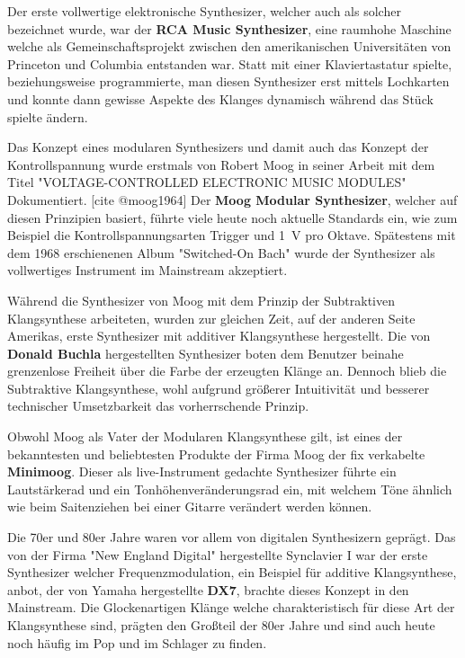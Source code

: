 Der erste vollwertige elektronische Synthesizer, welcher auch als solcher bezeichnet wurde, war der \textbf{RCA Music Synthesizer}, eine raumhohe Maschine welche als Gemeinschaftsprojekt zwischen den amerikanischen Universitäten von Princeton und Columbia entstanden war. Statt mit einer Klaviertastatur spielte, beziehungsweise programmierte, man diesen Synthesizer erst mittels Lochkarten und konnte dann gewisse Aspekte des Klanges dynamisch während das Stück spielte ändern.

Das Konzept eines modularen Synthesizers und damit auch das Konzept der Kontrollspannung wurde erstmals von Robert Moog in seiner Arbeit mit dem Titel "VOLTAGE-CONTROLLED ELECTRONIC MUSIC MODULES" Dokumentiert. [cite @moog1964] Der \textbf{Moog Modular Synthesizer}, welcher auf diesen Prinzipien basiert, führte viele heute noch aktuelle Standards ein, wie zum Beispiel die Kontrollspannungsarten Trigger und \SI{1}{\volt} pro Oktave. Spätestens mit dem 1968 erschienenen Album "Switched-On Bach" wurde der Synthesizer als vollwertiges Instrument im Mainstream akzeptiert.

Während die Synthesizer von Moog mit dem Prinzip der Subtraktiven Klangsynthese arbeiteten, wurden zur gleichen Zeit, auf der anderen Seite Amerikas, erste Synthesizer mit additiver Klangsynthese hergestellt. Die von \textbf{Donald Buchla} hergestellten Synthesizer boten dem Benutzer beinahe grenzenlose Freiheit über die Farbe der erzeugten Klänge an. Dennoch blieb die Subtraktive Klangsynthese, wohl aufgrund größerer Intuitivität und besserer technischer Umsetzbarkeit das vorherrschende Prinzip.

Obwohl Moog als Vater der Modularen Klangsynthese gilt, ist eines der bekanntesten und beliebtesten Produkte der Firma Moog der fix verkabelte \textbf{Minimoog}. Dieser als live-Instrument gedachte Synthesizer führte ein Lautstärkerad und ein Tonhöhenveränderungsrad ein, mit welchem Töne ähnlich wie beim Saitenziehen bei einer Gitarre verändert werden können.

Die 70er und 80er Jahre waren vor allem von digitalen Synthesizern geprägt. Das von der Firma "New England Digital" hergestellte Synclavier I war der erste Synthesizer welcher Frequenzmodulation, ein Beispiel für additive Klangsynthese, anbot, der von Yamaha hergestellte \textbf{DX7}, brachte dieses Konzept in den Mainstream. Die Glockenartigen Klänge welche charakteristisch für diese Art der Klangsynthese sind, prägten den Großteil der 80er Jahre und sind auch heute noch häufig im Pop und im Schlager zu finden.

